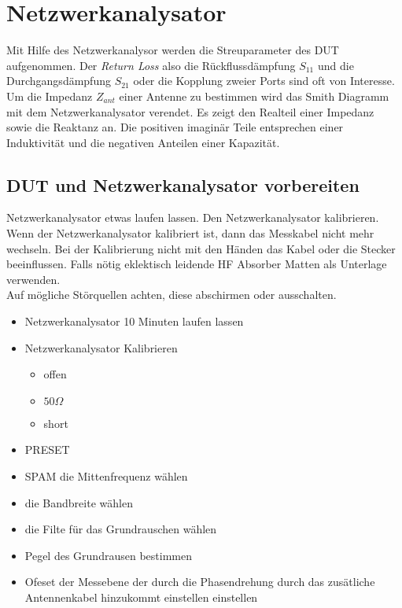 \section{ Netzwerkanalysator }
Mit Hilfe des Netzwerkanalysor werden die Streuparameter des DUT aufgenommen. Der \textit{Return Loss} also  die Rückflussdämpfung $S_{11}$ und die Durchgangsdämpfung $S_{21}$ oder die Kopplung zweier Ports sind oft von Interesse.\\
	Um die Impedanz $Z_{ant}$ einer Antenne zu bestimmen wird das Smith Diagramm mit dem Netzwerkanalysator verendet. Es zeigt den Realteil einer Impedanz sowie die Reaktanz an. Die positiven imaginär Teile entsprechen einer Induktivität  und die negativen Anteilen einer Kapazität.
	
	\subsection{DUT und Netzwerkanalysator vorbereiten}
	Netzwerkanalysator etwas laufen lassen. Den Netzwerkanalysator kalibrieren.  Wenn der Netzwerkanalysator kalibriert ist, dann das Messkabel nicht mehr wechseln. Bei der Kalibrierung nicht mit den Händen das Kabel oder die Stecker beeinflussen. Falls nötig eklektisch leidende HF Absorber Matten als Unterlage verwenden. \\
	Auf mögliche Störquellen achten, diese abschirmen oder ausschalten.
	\begin{itemize}
	\item Netzwerkanalysator 10 Minuten laufen lassen
	\item Netzwerkanalysator Kalibrieren
	\begin{itemize}
	\item offen
	\item $50\Omega$
	\item short
	\end{itemize}

	\item PRESET
	\item SPAM die Mittenfrequenz wählen
	\item die Bandbreite wählen
	\item die Filte für das Grundrauschen wählen
	\item Pegel des Grundrausen bestimmen
		\item Ofeset der Messebene  der durch die Phasendrehung durch das zusätliche Antennenkabel hinzukommt einstellen einstellen
	\end{itemize}
	
